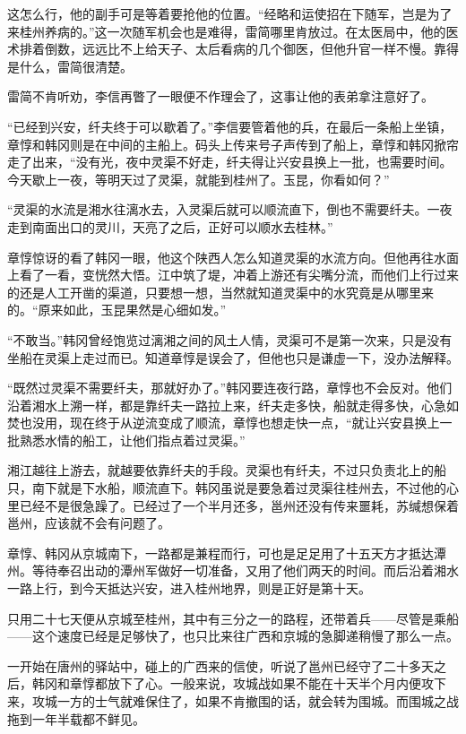 这怎么行，他的副手可是等着要抢他的位置。“经略和运使招在下随军，岂是为了来桂州养病的。”这一次随军机会也是难得，雷简哪里肯放过。在太医局中，他的医术排着倒数，远远比不上给天子、太后看病的几个御医，但他升官一样不慢。靠得是什么，雷简很清楚。

雷简不肯听劝，李信再瞥了一眼便不作理会了，这事让他的表弟拿注意好了。

“已经到兴安，纤夫终于可以歇着了。”李信要管着他的兵，在最后一条船上坐镇，章惇和韩冈则是在中间的主船上。码头上传来号子声传到了船上，章惇和韩冈掀帘走了出来，“没有光，夜中灵渠不好走，纤夫得让兴安县换上一批，也需要时间。今天歇上一夜，等明天过了灵渠，就能到桂州了。玉昆，你看如何？”

“灵渠的水流是湘水往漓水去，入灵渠后就可以顺流直下，倒也不需要纤夫。一夜走到南面出口的灵川，天亮了之后，正好可以顺水去桂林。”

章惇惊讶的看了韩冈一眼，他这个陕西人怎么知道灵渠的水流方向。但他再往水面上看了一看，变恍然大悟。江中筑了堤，冲着上游还有尖嘴分流，而他们上行过来的还是人工开凿的渠道，只要想一想，当然就知道灵渠中的水究竟是从哪里来的。“原来如此，玉昆果然是心细如发。”

“不敢当。”韩冈曾经饱览过漓湘之间的风土人情，灵渠可不是第一次来，只是没有坐船在灵渠上走过而已。知道章惇是误会了，但他也只是谦虚一下，没办法解释。

“既然过灵渠不需要纤夫，那就好办了。”韩冈要连夜行路，章惇也不会反对。他们沿着湘水上溯一样，都是靠纤夫一路拉上来，纤夫走多快，船就走得多快，心急如焚也没用，现在终于从逆流变成了顺流，章惇也想走快一点，“就让兴安县换上一批熟悉水情的船工，让他们指点着过灵渠。”

湘江越往上游去，就越要依靠纤夫的手段。灵渠也有纤夫，不过只负责北上的船只，南下就是下水船，顺流直下。韩冈虽说是要急着过灵渠往桂州去，不过他的心里已经不是很急躁了。已经过了一个半月还多，邕州还没有传来噩耗，苏缄想保着邕州，应该就不会有问题了。

章惇、韩冈从京城南下，一路都是兼程而行，可也是足足用了十五天方才抵达潭州。等待奉召出动的潭州军做好一切准备，又用了他们两天的时间。而后沿着湘水一路上行，到今天抵达兴安，进入桂州地界，则是正好是第十天。

只用二十七天便从京城至桂州，其中有三分之一的路程，还带着兵——尽管是乘船——这个速度已经是足够快了，也只比来往广西和京城的急脚递稍慢了那么一点。

一开始在唐州的驿站中，碰上的广西来的信使，听说了邕州已经守了二十多天之后，韩冈和章惇都放下了心。一般来说，攻城战如果不能在十天半个月内便攻下来，攻城一方的士气就难保住了，如果不肯撤围的话，就会转为围城。而围城之战拖到一年半载都不鲜见。

